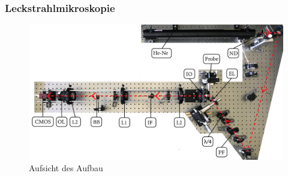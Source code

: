 \documentclass[aspectratio=1610]{beamer}
\begin{document}
	\begin{frame}
		\frametitle{Leckstrahlmikroskopie}
		\begin{figure}
			\centering
			\includegraphics[width=\textwidth]{figures/aufsicht_aufbau_anotated.jpg}
			\caption{Aufsicht des Aufbau}			
		\end{figure}		
	\end{frame}
	
	

	
\end{document}
